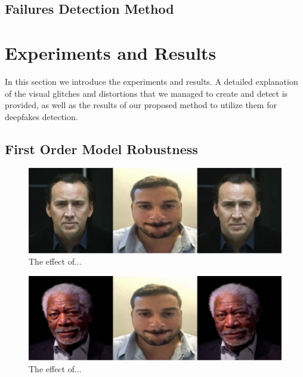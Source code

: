 \documentclass[english,12pt]{article}
\begin{document}


\subsection{Failures Detection Method}



\section{Experiments and Results} \label{experiments and results}

In this section we introduce the experiments and results. A detailed explanation of the
visual glitches and distortions that we managed to create and detect is provided, as well
as the results of our proposed method to utilize them for deepfakes detection.

\subsection{First Order Model Robustness}

\begin{figure}[htb]
  \begin{centering}
      \includegraphics[scale=0.29]{images/‏‏Amit_lips_cage.PNG}
  \par\end{centering}
  \caption{\label{fig:Amit_lips_cage}The effect of...}
\end{figure}

\begin{figure}[htb]
  \begin{centering}
      \includegraphics[scale=0.29]{images/‏‏Amit_lips_freeman.PNG}
  \par\end{centering}
  \caption{\label{fig:Amit_lips_freeman}The effect of...}
\end{figure}
\end{document}
